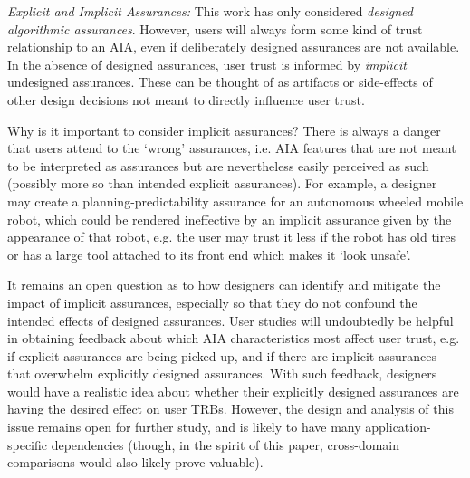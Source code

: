 \emph{Explicit and Implicit Assurances:}
This work has only considered \emph{designed algorithmic assurances}. However, users will always form some kind of trust relationship to an AIA, even if deliberately designed assurances are not available. In the absence of designed assurances, user trust is informed by \emph{implicit} undesigned assurances. These can be thought of as artifacts or side-effects of other design decisions not meant to directly influence user trust.

Why is it important to consider implicit assurances? There is always a danger that users attend to the `wrong' assurances, i.e. AIA features that are not meant to be interpreted as assurances but are nevertheless easily perceived as such (possibly more so than intended explicit assurances). For example, a designer may create a planning-predictability assurance for an autonomous wheeled mobile robot, which could be rendered ineffective by an implicit assurance given by the appearance of that robot, e.g. the user may trust it less if the robot has old tires or has a large tool attached to its front end which makes it `look unsafe'. 

It remains an open question as to how designers can identify and mitigate the impact of implicit assurances, especially so that they do not confound the intended effects of designed assurances. 
User studies will undoubtedly be helpful in obtaining feedback about which AIA characteristics most affect user trust, e.g. if explicit assurances are being picked up, and if there are implicit assurances that overwhelm explicitly designed assurances. With such feedback, designers would have a realistic idea about whether their explicitly designed assurances are having the desired effect on user TRBs. 
However, the design and analysis of this issue remains open for further study, and is likely to have many application-specific dependencies (though, in the spirit of this paper, cross-domain comparisons would also likely prove valuable). 
